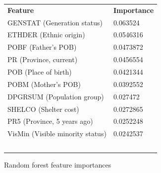 \documentclass[10pt, conference, compsocconf]{IEEEtran}
\begin{document}
\begin{figure}
  \begin{tabular}{ll}
  \textbf{Feature} & \textbf{Importance} \\
  GENSTAT (Generation status) & 0.063524 \\
  ETHDER (Ethnic origin)  & 0.0546316 \\
  POBF (Father's POB) & 0.0473872  \\
  PR (Province, current)  & 0.0456554 \\
  POB (Place of birth)  & 0.0421344 \\
  POBM (Mother's POB) & 0.0392552  \\
  DPGRSUM (Population group)  & 0.027472  \\
  SHELCO (Shelter cost) & 0.0272865 \\
  PR5 (Province, 5 years ago) & 0.0252248 \\
  VisMin (Visible minority status)  & 0.0242537 \\\
  \end{tabular}
  \caption{Random forest feature importances}
  \label{fig:random_forest_importances}
\end{figure}

%
%

\end{document}
